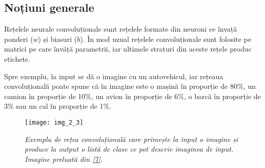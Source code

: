 \subsection{Noțiuni generale}

Rețelele neurale convoluționale sunt rețelele formate din neuroni ce învață ponderi ($w$) și biasuri ($b$). În mod uzual rețelele convoluționale sunt folosite pe matrici pe care învăță parametrii, iar ultimele straturi din aceste rețele produc etichete. 

Spre exemplu, la input se dă o imagine cu un autovehicul, iar rețeaua convoluțională poate spune că în imagine este o mașină în proporție de 80\%, un camion în proporție de 10\%, un avion în proporție de 6\%, o barcă în proporție de 3\% sau un cal în proporție de 1\%.
\begin{figure}[!h]
	\centering
	\texttt{[image: img\_2\_3]}
	\caption[Exemplu rețea convoluțională]{\textit{Exemplu de rețea convoluțională care primește la input o imagine și produce la output o listă de clase ce pot descrie imaginea de input. Imagine preluată din \hyperlink{datameetsmedia}{[7]}.}}
\end{figure} 


